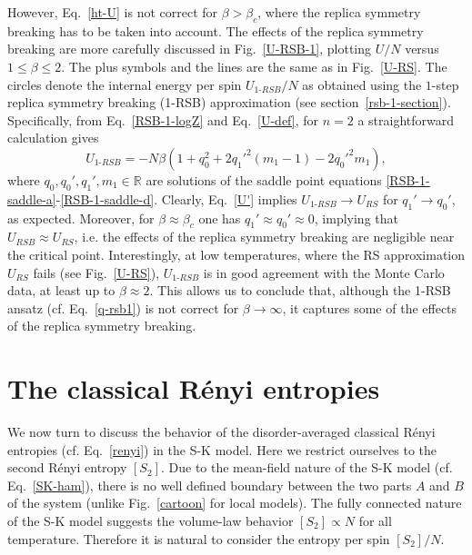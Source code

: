 \documentclass[twocolumn,superscriptaddress,prb,10pt]{revtex4-1}
\begin{document}
However, Eq.~\eqref{ht-U} is not correct for $\beta>\beta_c$, where the replica symmetry breaking 
has to be taken into account. The effects of the replica symmetry breaking are more carefully 
discussed in Fig.~\ref{U-RSB-1}, plotting $U/N$ versus $1\le\beta\le 2$. The plus symbols and the 
lines are the same as in Fig.~\ref{U-RS}. The circles denote the internal energy per spin 
$U_{1\textrm{-}RSB}/N$ as obtained using the $1$-step replica symmetry breaking (1-RSB) 
approximation (see section~\ref{rsb-1-section}). Specifically, from Eq.~\eqref{RSB-1-logZ} 
and Eq.~\eqref{U-def}, for $n=2$ a straightforward calculation gives 
%
\begin{equation}
U_{1\textrm{-}RSB}=-N\beta(1+q_0^2+2q_1'^2(m_1-1)-2q_0'^2m_1), 
\label{U'}
\end{equation}
%
where $q_0,q_0',q_1',m_1\in\mathbb{R}$ are solutions of the saddle point 
equations \eqref{RSB-1-saddle-a}-\eqref{RSB-1-saddle-d}. Clearly, Eq.~\eqref{U'} 
implies $U_{1\textrm{-}RSB}\to U_{RS}$ for $q_1'\to q_0'$, as expected. 
Moreover, for $\beta\approx\beta_c$ one has $q_1'\approx q_0'\approx0$, implying   
that $U_{RSB}\approx U_{RS}$, i.e. the effects of the replica symmetry breaking are 
negligible near the critical point. Interestingly, at low temperatures, where the 
RS approximation $U_{RS}$ fails (see Fig.~\ref{U-RS}), $U_{1\textrm{-}RSB}$ 
is in good agreement with the Monte Carlo data, at least up to $\beta\approx 2$.  
This allows us to conclude that, although the 1-RSB ansatz (cf. Eq.~\eqref{q-rsb1}) 
is not correct for $\beta\to\infty$, it captures some of the effects 
of the replica symmetry breaking.  


\section{The classical R\'enyi entropies}
\label{Renyi-section}

We now turn to discuss the behavior of the disorder-averaged classical R\'enyi entropies 
(cf. Eq.~\eqref{renyi}) in the S-K model. Here we restrict ourselves to the second R\'enyi 
entropy $[S_2]$. Due to the mean-field nature of the S-K model (cf. Eq.~\eqref{SK-ham}), 
there is no well defined boundary between the two parts $A$ and $B$ of the system 
(unlike Fig.~\ref{cartoon} for local models). The fully connected nature of the S-K model 
suggests the volume-law behavior $[S_2]\propto N$ for all temperature.
Therefore it is natural to consider the entropy per spin $[S_2]/N$. 
\end{document}
